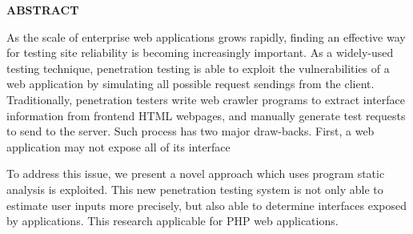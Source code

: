 \clearpage
\begin{centering}
\textbf{ABSTRACT}\\
\vspace{\baselineskip}
\end{centering}

As the scale of enterprise web applications grows rapidly, finding an effective way for testing site reliability is becoming increasingly important. As a widely-used testing technique, penetration testing is able to exploit the vulnerabilities of a web application by simulating all possible request sendings from the client. Traditionally, penetration testers write web crawler programs to extract interface information from frontend HTML webpages, and manually generate test requests to send to the server. Such process has two major draw-backs. First, a web application may not expose all of its interface

To address this issue, we present a novel approach which uses program static analysis is exploited. This new penetration testing system is not only able to estimate user inputs more precisely, but also able to determine interfaces exposed by applications. This research applicable for PHP web applications.


